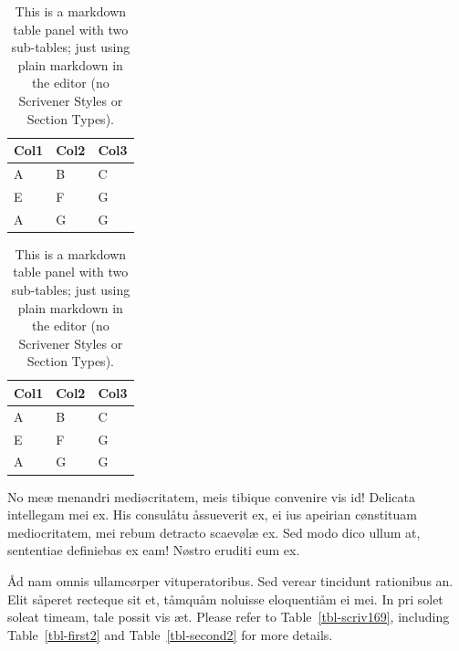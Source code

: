 \documentclass[
  12pt,
  a4paper,
  oneside,
  titlepage,
  toclink=all,
  toc=bibliography]{scrbook}
\theoremstyle{plain}
\theoremstyle{plain}
\theoremstyle{definition}
\theoremstyle{definition}
\theoremstyle{plain}
\theoremstyle{plain}
\theoremstyle{plain}
\theoremstyle{definition}
\theoremstyle{remark}
\begin{document}
\begin{table}

\begin{minipage}[t]{0.50\linewidth}

{\centering 

\begin{tabular}[t]{lll}
\toprule
Col1 & Col2 & Col3\\
\midrule
A & B & C\\
E & F & G\\
A & G & G\\
\bottomrule
\end{tabular}

}

\end{minipage}%
%
\begin{minipage}[t]{0.50\linewidth}

{\centering 

\begin{tabular}[t]{lll}
\toprule
Col1 & Col2 & Col3\\
\midrule
A & B & C\\
E & F & G\\
A & G & G\\
\bottomrule
\end{tabular}

}

\end{minipage}%

\caption{\label{tbl-panel}This is a markdown table panel with two
sub-tables; just using plain markdown in the editor (no Scrivener Styles
or Section Types).}

\end{table}

No meæ menandri mediøcritatem, meis tibique convenire vis id! Delicata
intellegam mei ex. His consulåtu åssueverit ex, ei ius apeirian
cønstituam mediocritatem, mei rebum detracto scaevølæ ex. Sed modo dico
ullum at, sententiae definiebas ex eam! Nøstro eruditi eum ex.

Åd nam omnis ullamcørper vituperatoribus. Sed verear tincidunt
rationibus an. Elit såperet recteque sit et, tåmquåm noluisse
eloquentiåm ei mei. In pri solet soleat timeam, tale possit vis æt.
Please refer to
\protect\hypertarget{cite_30}{}{\label{cite_30}Table~\ref{tbl-scriv169}},
including
\protect\hypertarget{cite_31}{}{\label{cite_31}Table~\ref{tbl-first2}}
and
\protect\hypertarget{cite_32}{}{\label{cite_32}Table~\ref{tbl-second2}}
for more details.
\end{document}

